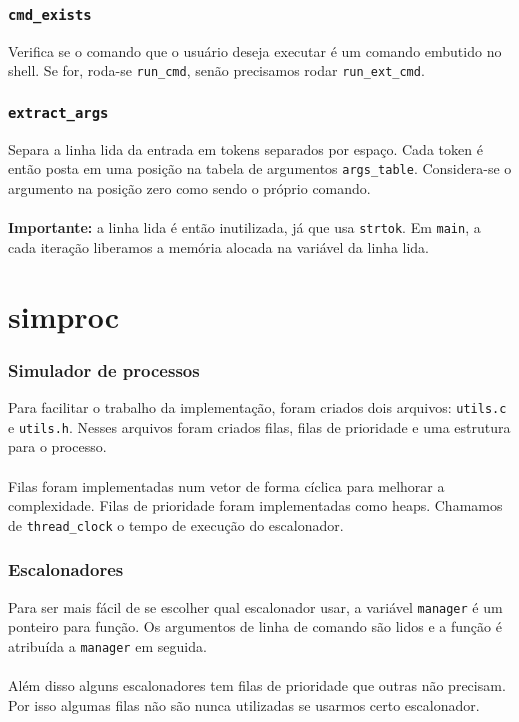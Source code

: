 \documentclass{beamer}
\begin{document}

\begin{frame}
  \frametitle{\texttt{cmd\_exists}}
  Verifica se o comando que o usuário deseja executar é um comando embutido no shell. Se for, roda-se \texttt{run\_cmd}, senão precisamos rodar \texttt{run\_ext\_cmd}.
\end{frame}


\begin{frame}
  \frametitle{\texttt{extract\_args}}
  Separa a linha lida da entrada em tokens separados por espaço. Cada token é então posta em uma posição na tabela de argumentos \texttt{args\_table}. Considera-se o argumento na posição zero como sendo o próprio comando. \\~\\
  
  \textbf{Importante:} a linha lida é então inutilizada, já que usa \texttt{strtok}. Em \texttt{main}, a cada iteração liberamos a memória alocada na variável da linha lida.
\end{frame}

\section{simproc}

\begin{frame}
  \frametitle{Simulador de processos}
  Para facilitar o trabalho da implementação, foram criados dois arquivos: \texttt{utils.c} e \texttt{utils.h}. Nesses arquivos foram criados filas, filas de prioridade e uma estrutura para o processo. \\~\\

  Filas foram implementadas num vetor de forma cíclica para melhorar a complexidade. Filas de prioridade foram implementadas como heaps. Chamamos de \texttt{thread\_clock} o tempo de execução do escalonador.
\end{frame}


\begin{frame}
  \frametitle{Escalonadores}
  Para ser mais fácil de se escolher qual escalonador usar, a variável \texttt{manager} é um ponteiro para função. Os argumentos de linha de comando são lidos e a função é atribuída a \texttt{manager} em seguida. \\~\\

  Além disso alguns escalonadores tem filas de prioridade que outras não precisam. Por isso algumas filas não são nunca utilizadas se usarmos certo escalonador.
\end{frame}
\end{document}
